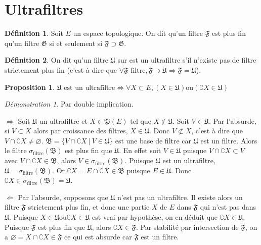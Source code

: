 \documentclass[a4paper, 11pt, french]{book}
\newenvironment{itemise}{\itemize}{\enditemize}
\theoremstyle{plain} %
\newtheorem{proposition}{Proposition}
\theoremstyle{definition} %
\newtheorem{definition}{Définition}
\theoremstyle{remark} %
\newtheorem*{demonstration}{Démonstration}
\newcommand{\1}{\mathds{1}}
\newcommand\vide{\varnothing}
\newcommand{\ou}{\mathrel{\mathrm{ou}}}
\renewcommand{\frak}[1]{\mathfrak{#1}}
\newcommand{\rm}[1]{\mathrm{#1}}
\newcommand\ens[2]{\{#1 \ |\ #2\}}
\newcommand\equivalence[3]{
	\begin{demonstration}
		#1
		\begin{itemise}
			\item[$\Longrightarrow$] #2
			\item[$\Longleftarrow$] #3
		\end{itemise}
	\end{demonstration}
}
\begin{document}
\section{Ultrafiltres}

\begin{definition}
	Soit $E$ un espace topologique.
	On dit qu'un filtre $\frak{F}$ est plus fin qu'un filtre $\frak{G}$ si et seulement si $\frak{F}\supset\frak{G}$.
\end{definition}

\begin{definition}
	On dit qu'un filtre $\frak{U}$ sur est un ultrafiltre s'il n'existe pas de filtre strictement plus fin (c'est à dire que $\forall\frak{F}\text{ filtre}, \frak{F}\supset\frak{U}\Rightarrow\frak{F}=\frak{U}$).
\end{definition}

\begin{proposition}
	$\frak{U}\text{ est un ultrafiltre}\iff\forall X\subset E, (X\in\frak{U})\ou(\complement X\in\frak{U})$
\end{proposition}

\equivalence{Par double implication.}{
	Soit $\frak{U}$ un ultrafiltre et $X\in\frak{P}(E)$ tel que $X\notin\frak{U}$.
		Soit $V\in\frak{U}$.
		Par l'absurde, si $V\subset X$ alors par croissance des filtres, $X\in\frak{U}$.
		Donc $V\not\subset X$, c'est à dire que $V\cap\complement X\neq\vide$.
		$\frak{B}=\ens{V\cap\complement X}{V\in\frak{U}}$ est une base de filtre car $\frak{U}$ est un filtre.
		Alors le filtre $\sigma_\rm{filtre}(\frak{B})$ est plus fin que $\frak{U}$.
		En effet soit $V\in\frak{U}$ puisque $V\cap\complement X\subset V$ avec $V\cap\complement X\in\frak{B}$, alors $V\in\sigma_\rm{filtre}(\frak{B})$.
		Puisque $\frak{U}$ est un ultrafiltre, $\frak{U}=\sigma_\rm{filtre}(\frak{B})$.
		Or $\complement X=E\cap\complement X\in\frak{B}$ puisque $E\in\frak{U}$.
		Donc $\complement X\in\sigma_\rm{filtre}(\frak{B})=\frak{U}$.
}{
	Par l'absurde, supposons que $\frak{U}$ n'est pas un ultrafiltre.
		Il existe alors un filtre $\frak{F}$ strictement plus fin, et donc une partie $X$ de $E$ dans $\frak{F}$ qui n'est pas dans $\frak{U}$.
		Puisque $X\in\frak{U}\ou\complement X\in\frak{U}$ est vrai par hypothèse, on en déduit que $\complement X\in\frak{U}$.
		Puisque $\frak{F}$ est plus fin que $\frak{U}$, alors $\complement X\in\frak{F}$.
		Par stabilité par intersection de $\frak{F}$, on a $\vide=X\cap\complement X\in\frak{F}$ ce qui est absurde car $\frak{F}$ est un filtre.
}
\end{document}
